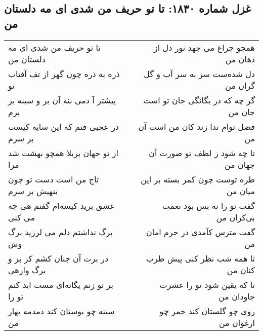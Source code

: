 \begin{center}
\section*{غزل شماره ۱۸۳۰: تا تو حریف من شدی ای مه دلستان من}
\label{sec:1830}
\begin{longtable}{l p{0.5cm} r}
تا تو حریف من شدی ای مه دلستان من
&&
همچو چراغ می جهد نور دل از دهان من
\\
ذره به ذره چون گهر از تف آفتاب تو
&&
دل شده‌ست سر به سر آب و گل گران من
\\
پیشتر آ دمی بنه آن بر و سینه بر برم
&&
گر چه که در یگانگی جان تو است جان من
\\
در عجبی فتم که این سایه کیست بر سرم
&&
فضل توام ندا زند کان من است آن من
\\
از تو جهان پربلا همچو بهشت شد مرا
&&
تا چه شود ز لطف تو صورت آن جهان من
\\
تاج من است دست تو چون بنهیش بر سرم
&&
طره توست چون کمر بسته بر این میان من
\\
عشق برید کیسه‌ام گفتم هی چه می کنی
&&
گفت تو را نه بس بود نعمت بی‌کران من
\\
برگ نداشتم دلم می لرزید برگ وش
&&
گفت مترس کآمدی در حرم امان من
\\
در برت آن چنان کشم کز بر و برگ وارهی
&&
تا همه شب نظر کنی پیش طرب کنان من
\\
بر تو زنم یگانه‌ای مست ابد کنم تو را
&&
تا که یقین شود تو را عشرت جاودان من
\\
سینه چو بوستان کند دمدمه بهار من
&&
روی چو گلستان کند خمر چو ارغوان من
\\
\end{longtable}
\end{center}
